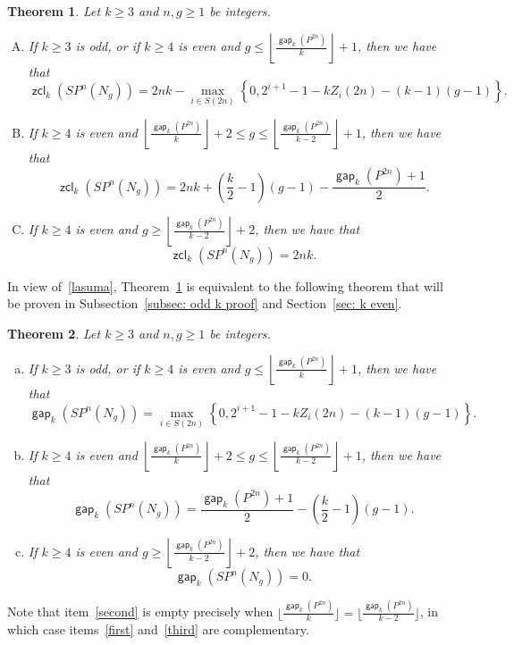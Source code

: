 \documentclass[amscd,amssymb,verbatim,10pt]{amsart}
\numberwithin{equation}{section}
\theoremstyle{plain}
\newtheorem{thm}{Theorem}[section]
\theoremstyle{definition}
\DeclareMathOperator{\zcl}{{\mathsf{zcl}}}
\DeclareMathOperator{\gap}{{\mathsf{gap}}}
\begin{document}
\begin{thm}\label{thm: zcl k ge 3}
    Let $k\ge 3$ and $n,g\ge 1$ be integers.
    \begin{enumerate}[(A)]
        \item If $k\ge 3$ is odd, or if $k\ge 4$ is even and $g\le \left\lfloor \tfrac{\gap_k(P^{2n})}{k}\right\rfloor+1$, then we have that
 \[
         \zcl_k(SP^n(N_g))=2nk-\max_{i\in S(2n)}\left\{0,2^{i+1}-1-kZ_i(2n)-(k-1)(g-1)\right\}.
 \]\label{1st}
    \item If $k\ge 4$ is even and $\left\lfloor \tfrac{\gap_k(P^{2n})}{k}\right\rfloor+2\le g\le\left\lfloor\tfrac{\gap_k(P^{2n})}{k-2}\right\rfloor+1$, then we have that
    \[
    \zcl_k(SP^n(N_g))=2nk+\left(\frac{k}{2}-1\right)\left(g-1\right)-\frac{\gap_k(P^{2n})+1}{2}.
    \]\label{2nd}
    \item If $k\ge 4$ is even and $g\ge\left\lfloor\tfrac{\gap_k(P^{2n})}{k-2}\right\rfloor+2$, then we have that 
    \[
    \zcl_k(SP^n(N_g))=2nk.
    \]\label{3rd}
\end{enumerate}
\end{thm}

In view of~\eqref{lasuma}, Theorem~\ref{thm: zcl k ge 3} is equivalent to the following theorem that will be proven in Subsection~\ref{subsec: odd k proof} and Section~\ref{sec: k even}.

\begin{thm}\label{thm: gap k ge 3}
    Let $k\ge 3$ and $n,g\ge 1$ be integers.
    \begin{enumerate}[(a)]
        \item If $k\ge 3$ is odd, or if $k\ge 4$ is even and $g\le \left\lfloor \tfrac{\gap_k(P^{2n})}{k}\right\rfloor+1$, then we have that
 \[
    \gap_k(SP^n(N_g))=\max_{i\in S(2n)}\left\{0,2^{i+1}-1-kZ_i(2n)-(k-1)(g-1)\right\}.
    \]    \label{first}
    \item If $k\ge 4$ is even and $\left\lfloor \tfrac{\gap_k(P^{2n})}{k}\right\rfloor+2\le g\le\left\lfloor\tfrac{\gap_k(P^{2n})}{k-2}\right\rfloor+1$, then we have that
    \[
    \gap_k(SP^n(N_g))=\frac{\gap_k(P^{2n})+1}{2}-\left(\frac{k}{2}-1\right)\left(g-1\right).
    \]\label{second}
    \item If $k\ge 4$ is even and $g\ge\left\lfloor\tfrac{\gap_k(P^{2n})}{k-2}\right\rfloor+2$, then we have that 
    \[
    \gap_k(SP^n(N_g))=0.
    \]\label{third}
\end{enumerate}
\end{thm}

Note that item~\eqref{second} is empty precisely when $\bigl\lfloor\tfrac{\gap_k(P^{2n})}{k}\bigr\rfloor=\bigl\lfloor\tfrac{\gap_k(P^{2n})}{k-2}\bigr\rfloor$, in which case items~\eqref{first} and~\eqref{third} are complementary.
\end{document}
